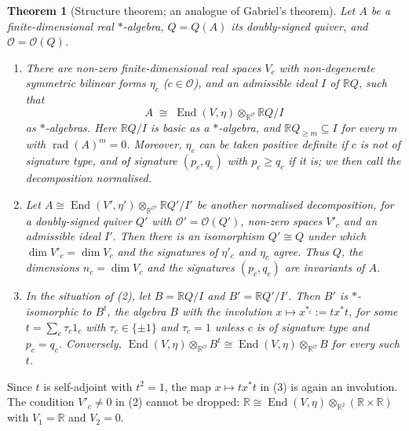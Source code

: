 \documentclass[12pt, a4paper]{report}
\theoremstyle{plain}
\newtheorem{theorem}{Theorem}[chapter]
\theoremstyle{definition}
\theoremstyle{remark}
\theoremstyle{plain}
\newcommand{\rad}[0]{\operatorname{rad}} %
\newcommand{\RR}{\mathbb{R}}
\DeclareMathOperator{\End}{End}
\begin{document}
\begin{theorem}[Structure theorem; an analogue of Gabriel's theorem]\label{thm:structure}
Let $A$ be a finite-dimensional real $*$-algebra, $Q=Q(A)$ its doubly-signed quiver, and $\mathcal O=\mathcal O(Q)$.
\begin{enumerate}
  \item There are non-zero finite-dimensional real spaces $V_c$ with non-degenerate symmetric bilinear forms $\eta_c$ ($c\in\mathcal O$), and an admissible ideal $I$ of $\RR Q$, such that
  \[ A\;\cong\;\End(V,\eta)\otimes_{\RR^{\mathcal O}}\RR Q/I \]
  as $*$-algebras. Here $\RR Q/I$ is basic as a $*$-algebra, and $\RR Q_{\geq m}\subseteq I$ for every $m$ with $\rad(A)^m=0$. Moreover, $\eta_c$ can be taken positive definite if $c$ is not of signature type, and of signature $(p_c,q_c)$ with $p_c\geq q_c$ if it is; we then call the decomposition \emph{normalised}.
  \item Let $A\cong\End(V',\eta')\otimes_{\RR^{\mathcal O'}}\RR Q'/I'$ be another normalised decomposition, for a doubly-signed quiver $Q'$ with $\mathcal O'=\mathcal O(Q')$, non-zero spaces $V'_c$ and an admissible ideal $I'$. Then there is an isomorphism $Q'\cong Q$ under which $\dim V'_c=\dim V_c$ and the signatures of $\eta'_c$ and $\eta_c$ agree. Thus $Q$, the dimensions $n_c=\dim V_c$ and the signatures $(p_c,q_c)$ are invariants of $A$.
  \item In the situation of (2), let $B=\RR Q/I$ and $B'=\RR Q'/I'$. Then $B'$ is $*$-isomorphic to $B^t$, the algebra $B$ with the involution $x\mapsto x^{*_t}:=tx^*t$, for some $t=\sum_c\tau_c1_c$ with $\tau_c\in\{\pm1\}$ and $\tau_c=1$ unless $c$ is of signature type and $p_c=q_c$. Conversely, $\End(V,\eta)\otimes_{\RR^{\mathcal O}}B^t\cong\End(V,\eta)\otimes_{\RR^{\mathcal O}}B$ for every such $t$.
\end{enumerate}
\end{theorem}
Since $t$ is self-adjoint with $t^2=1$, the map $x\mapsto tx^*t$ in (3) is again an involution. The condition $V'_c\neq0$ in (2) cannot be dropped: $\RR\cong\End(V,\eta)\otimes_{\RR^2}(\RR\times\RR)$ with $V_1=\RR$ and $V_2=0$.
\end{document}
